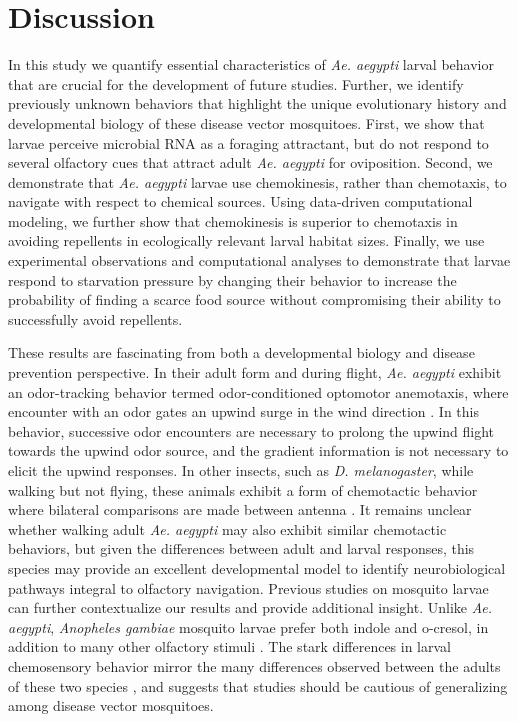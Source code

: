 \section*{Discussion}

\noindent In this study we quantify essential characteristics of \textit{Ae. aegypti} larval behavior that are crucial for the development of future studies. Further, we identify previously unknown behaviors that highlight the unique evolutionary history and developmental biology of these disease vector mosquitoes. First, we show that larvae perceive microbial RNA as a foraging attractant, but do not respond to several olfactory cues that attract adult \textit{Ae. aegypti} for oviposition. Second, we demonstrate that \textit{Ae. aegypti} larvae use chemokinesis, rather than chemotaxis, to navigate with respect to chemical sources. Using data-driven computational modeling, we further show that chemokinesis is superior to chemotaxis in avoiding repellents in ecologically relevant larval habitat sizes. Finally, we use experimental observations and computational analyses to demonstrate that larvae respond to starvation pressure by changing their behavior to increase the probability of finding a scarce food source without compromising their ability to successfully avoid repellents. 



These results are fascinating from both a developmental biology and disease prevention perspective. In their adult form and during flight, \textit{Ae. aegypti} exhibit an odor-tracking behavior termed odor-conditioned optomotor anemotaxis, where encounter with an odor gates an upwind surge in the wind direction \cite{Van_Breugel2015-an}. In this behavior, successive odor encounters are necessary to prolong the upwind flight towards the upwind odor source, and the gradient information is not necessary to elicit the upwind responses. In other insects, such as \textit{D. melanogaster}, while walking but not flying, these animals exhibit a form of chemotactic behavior where bilateral comparisons are made between antenna \cite{Gaudry2012-li}. It remains unclear whether walking adult \textit{Ae. aegypti} may also exhibit similar chemotactic behaviors, but given the differences between adult and larval responses, this species may provide an excellent developmental model to  identify neurobiological pathways integral to olfactory navigation. Previous studies on mosquito larvae can further contextualize our results and provide additional insight. Unlike \textit{Ae. aegypti}, \textit{Anopheles gambiae} mosquito larvae prefer both indole and o-cresol, in addition to many other olfactory stimuli \cite{Xia2008-hw}. The stark differences in larval chemosensory behavior mirror the many differences observed between the adults of these two species \cite{Bohbot2007-nw}, and suggests that studies should be cautious of generalizing among disease vector mosquitoes.

